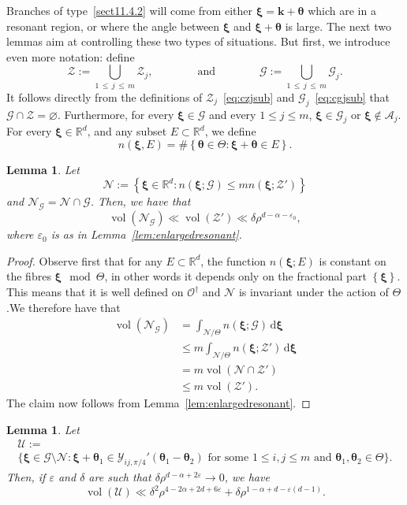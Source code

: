 \documentclass[10pt]{amsart}
\newtheorem{lemm}[theo]{Lemma}\newtheorem{prop}[theo]{Proposition}\newtheorem{coro}[theo]{Corollary}\newtheorem{conj}[theo]{Conjecture}
\theoremstyle{definition}\newtheorem{defi}[theo]{Definition}\newtheorem{rema}[theo]{Remark}\newtheorem{exam}[theo]{Example}\newtheorem{nota}[theo]{Notation}
\DeclareMathOperator{\vol}{vol}
\newcommand{\de}{\, \mathrm{d}}
\newcommand{\R}{\mathbb R}
\newcommand{\CA}{\mathcal{A}}
\newcommand{\CG}{\mathcal{G}}
\newcommand{\CN}{\mathcal{N}}
\newcommand{\CO}{\mathcal{O}}
\newcommand{\CU}{\mathcal{U}}
\newcommand{\CY}{\mathcal{Y}}
\newcommand{\CZ}{\mathcal{Z}}
\newcommand{\btheta}{\boldsymbol \theta}
\newcommand{\bxi}{\boldsymbol \xi}
\newcommand{\bk}{\mathbf k}
\newcommand{\eps}{\varepsilon}
\newcommand{\set}[1]{\left\{ #1 \right\}}
\begin{document}
Branches of type~\eqref{sect11.4.2} will come from either $\bxi = \bk + \btheta$ which are in a resonant region, or where the angle between $\bxi$ and $\bxi + \btheta$ is large. The next two lemmas aim at controlling these two types of situations. But first, we introduce even more notation: define
\begin{equation}
\CZ := \bigcup_{1\,\le\,j\,\le\,m} \CZ_j, \qquad \qquad \text{and} \qquad \qquad
\CG := \bigcup_{1\,\le\,j\,\le\,m} \CG_j.
\end{equation}
It follows directly from the definitions of $\CZ_j$~\eqref{eq:czjsub} and $\CG_j$~\eqref{eq:cgjsub} that $\CG \cap \CZ = \varnothing$. Furthermore, for every $\bxi \in \CG$ and every $1 \le j \le m$, $\bxi \in \CG_j$ or $\bxi \not \in
\CA_j$. For every $\bxi \in \R^d$, and any subset $E \subset \R^d$, we define
\begin{equation}
n(\bxi,E) = \#\set{\btheta \in \Theta : \bxi + \btheta \in E}.
\end{equation}
\begin{lemm}\label{lem:numinter}
Let
\begin{equation}
\CN := \set{\bxi \in \R^d : n(\bxi;\CG) \le m n(\bxi;\CZ')}
\end{equation}
and $\CN_\CG = \CN \cap \CG$. Then, we have that
\begin{equation}
\vol(\CN_\CG) \ll \vol(\CZ') \ll
\delta\rho^{d - \alpha - \eps_0},
\end{equation}
where $\eps_0$ is as in Lemma~\ref{lem:enlargedresonant}.
\end{lemm}
\begin{proof}
Observe first that for any $E \subset \R^d$, the function $n(\bxi;E)$ is constant on the fibres $\bxi \mod \Theta$, in other words it depends only on the fractional part $\set \bxi$. This means that it is well defined on $\CO^\dagger$ and $\CN$ is invariant under the action of $\Theta$.\linebreak We therefore have that
\begin{align}
\vol(\CN_\CG) &= \int_{\CN/\Theta} n(\bxi;\CG) \de \bxi \\
&\le m \int_{\CN/\Theta} n(\bxi;\CZ') \de \bxi \\
& = m \vol(\CN \cap \CZ') \\
&\le m \vol(\CZ').
\end{align}
The claim now follows from Lemma~\ref{lem:enlargedresonant}.
\end{proof}

\begin{lemm}\label{lem:goodcrossings}
Let
\begin{multline}\label{eq:CU}
\CU :=\\
\big\{\bxi \in \CG \setminus \CN : \bxi + \btheta_1 \in
\CY_{ij,\pi/4}'(\btheta_1 - \btheta_2) \text{ for some } 1 \le i,j \le m
\text{ and } \btheta_1,\btheta_2 \in \Theta\big\}.
\end{multline}
Then, if $\eps$ and $\delta$ are such that $\delta \rho^{d - \alpha + 2 \eps} \to 0$, we have
\begin{equation}
\vol(\CU) \ll \delta^2 \rho^{4 - 2 \alpha + 2 d + 6\eps} + \delta \rho^{1 - \alpha + d - \eps(d-1)}.
\end{equation}
\end{lemm}
\end{document}
